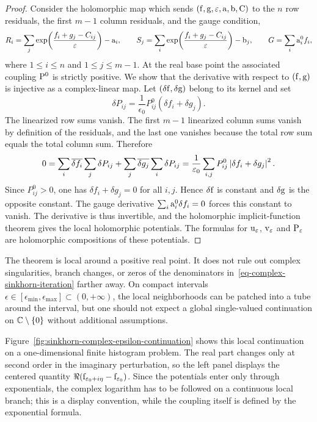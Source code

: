 \begin{proof}
	Consider the holomorphic map which sends $(\fD,\gD,\epsilon,\a,\b,\C)$ to the $n$ row residuals, the first $m-1$ column residuals, and the gauge condition,
	\[
		R_i=\sum_j
		\exp\!\left(\frac{f_i+g_j-C_{ij}}{\epsilon}\right)-\a_i,
		\qquad
		S_j=\sum_i
		\exp\!\left(\frac{f_i+g_j-C_{ij}}{\epsilon}\right)-\b_j,
		\qquad
		G=\sum_i \a_i^0 f_i ,
	\]
	where $1\leq i\leq n$ and $1\leq j\leq m-1$. At the real base point the associated coupling $\P^0$ is strictly positive. We show that the derivative with respect to $(\fD,\gD)$ is injective as a complex-linear map. Let $(\delta\fD,\delta\gD)$ belong to its kernel and set
	\[
		\delta P_{ij}
		=
		\frac{1}{\epsilon_0}P^0_{ij}(\delta f_i+\delta g_j).
	\]
	The linearized row sums vanish. The first $m-1$ linearized column sums vanish by definition of the residuals, and the last one vanishes because the total row sum equals the total column sum. Therefore
	\[
		0
		=
		\sum_i \overline{\delta f_i}\sum_j\delta P_{ij}
		+
		\sum_j \overline{\delta g_j}\sum_i\delta P_{ij}
		=
		\frac{1}{\epsilon_0}
		\sum_{i,j}P^0_{ij}\abs{\delta f_i+\delta g_j}^2 .
	\]
	Since $P^0_{ij}>0$, one has $\delta f_i+\delta g_j=0$ for all $i,j$. Hence $\delta\fD$ is constant and $\delta\gD$ is the opposite constant. The gauge derivative $\sum_i \a_i^0\delta f_i=0$ forces this constant to vanish. The derivative is thus invertible, and the holomorphic implicit-function theorem gives the local holomorphic potentials. The formulas for $\uD_\epsilon$, $\vD_\epsilon$ and $\P_\epsilon$ are holomorphic compositions of these potentials.
\end{proof}

\begin{rem}
	The theorem is local around a positive real point. It does not rule out complex singularities, branch changes, or zeros of the denominators in~\eqref{eq-complex-sinkhorn-iteration} farther away. On compact intervals $\epsilon\in[\epsilon_{\min},\epsilon_{\max}]\subset(0,+\infty)$, the local neighborhoods can be patched into a tube around the interval, but one should not expect a global single-valued continuation on $\CC\setminus\{0\}$ without additional assumptions.
\end{rem}

Figure~\ref{fig:sinkhorn-complex-epsilon-continuation} shows this local continuation on a one-dimensional finite histogram problem. The real part changes only at second order in the imaginary perturbation, so the left panel displays the centered quantity $\Re(\fD_{\epsilon_0+i\eta}-\fD_{\epsilon_0})$. Since the potentials enter only through exponentials, the complex logarithm has to be followed on a continuous local branch; this is a display convention, while the coupling itself is defined by the exponential formula.

